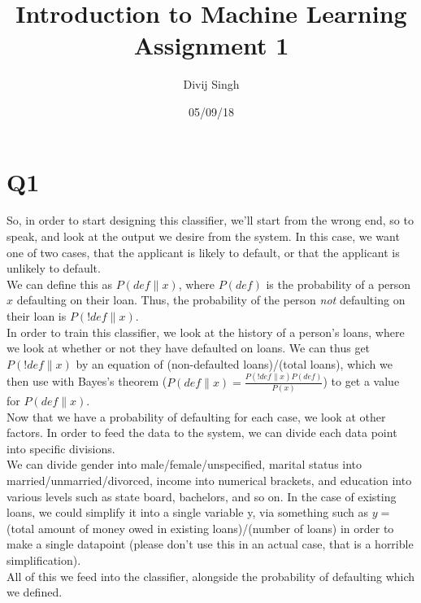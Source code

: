 \documentclass{article}
\title{Introduction to Machine Learning Assignment 1}
\author{Divij Singh}
\date{05/09/18}
\begin{document}
	\maketitle
	
	\section{Q1}
	So, in order to start designing this classifier, we'll start from the wrong end, so to speak, and look at the output we desire from the system. In this case, we want one of two cases, that the applicant is likely to default, or that the applicant is unlikely to default. \\
We can define this as $P(def \| x)$, where $P(def)$ is the probability of a person $x$ defaulting on their loan. Thus, the probability of the person \textit{not} defaulting on their loan is $P(!def \| x)$.\\
In order to train this classifier, we look at the history of a person's loans, where we look at whether or not they have defaulted on loans. We can thus get $P(!def \| x)$ by an equation of (non-defaulted loans)/(total loans), which we then use with Bayes's theorem ($P(def\| x) = \frac{P(!def \| x) P(def)}{P(x)}$) to get a value for $P(def\| x)$.\\
Now that we have a probability of defaulting for each case, we look at other factors. In order to feed the data to the system, we can divide each data point into specific divisions.\\
We can divide gender into male/female/unspecified, marital status into married/unmarried/divorced, income into numerical brackets, and education into various levels such as state board, bachelors, and so on. In the case of existing loans, we could simplify it into a single variable y, via something such as $y =$ (total amount of money owed in existing loans)/(number of loans) in order to make a single datapoint (please don't use this in an actual case, that is a horrible simplification).\\
All of this we feed into the classifier, alongside the probability of defaulting which we defined.
\end{document}
